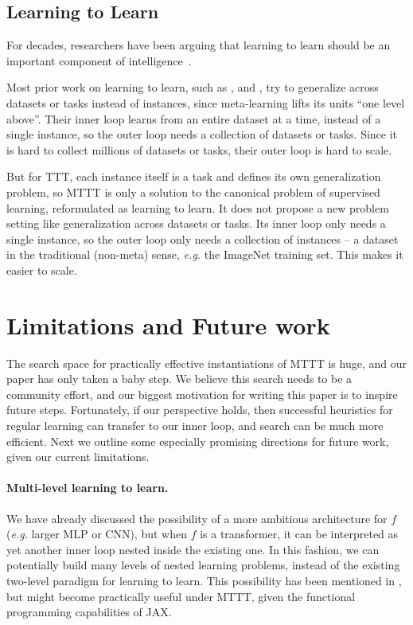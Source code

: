 \documentclass{article}
\begin{document}
\subsection{Learning to Learn}

For decades, researchers have been arguing that learning to learn should be an important component of intelligence~\citep{schmidhuber1987evolutionary, bengio1990learning, thrun1998learning, lake2017building}.

Most prior work on learning to learn, such as \cite{andrychowicz2016learning}, \cite{finn2017model} and \cite{metz2018meta}, try to generalize across datasets or tasks instead of instances, since meta-learning lifts its units ``one level above''.
Their inner loop learns from an entire dataset at a time, instead of a single instance, so the outer loop needs a collection of datasets or tasks.
Since it is hard to collect millions of datasets or tasks, their outer loop is hard to scale.

But for TTT, each instance itself is a task and defines its own generalization problem, so MTTT is only a solution to the canonical problem of supervised learning, reformulated as learning to learn.
It does not propose a new problem setting like generalization across datasets or tasks.
Its inner loop only needs a single instance, so the outer loop only needs a collection of instances -- a dataset in the traditional (non-meta) sense, \textit{e.g.} the ImageNet training set.
This makes it easier to scale.

\section{Limitations and Future work}
The search space for practically effective instantiations of MTTT is huge, and our paper has only taken a baby step.
We believe this search needs to be a community effort, and our biggest motivation for writing this paper is to inspire future steps.
Fortunately, if our perspective holds, then successful heuristics for regular learning can transfer to our inner loop, and search can be much more efficient.
Next we outline some especially promising directions for future work, given our current limitations.

\paragraph{Multi-level learning to learn.}
We have already discussed the possibility of a more ambitious architecture for $f$ (\textit{e.g.} larger MLP or CNN), but when $f$ is a transformer, it can be interpreted as yet another inner loop nested inside the existing one.
In this fashion, we can potentially build many levels of nested learning problems, instead of the existing two-level paradigm for learning to learn.
This possibility has been mentioned in \cite{irie2021going}, but might become practically useful under MTTT, given the functional programming capabilities of JAX.
\end{document}
